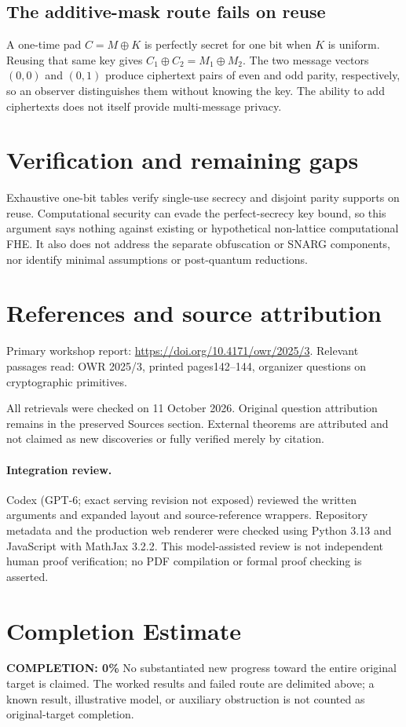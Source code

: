 \documentclass[11pt]{article}
\begin{document}
\subsection{The additive-mask route fails on reuse}
A one-time pad $C=M\oplus K$ is perfectly secret for one bit when $K$ is uniform. Reusing that same key gives $C_1\oplus C_2=M_1\oplus M_2$. The two message vectors $(0,0)$ and $(0,1)$ produce ciphertext pairs of even and odd parity, respectively, so an observer distinguishes them without knowing the key. The ability to add ciphertexts does not itself provide multi-message privacy.
\section{Verification and remaining gaps}
Exhaustive one-bit tables verify single-use secrecy and disjoint parity supports on reuse. Computational security can evade the perfect-secrecy key bound, so this argument says nothing against existing or hypothetical non-lattice computational FHE. It also does not address the separate obfuscation or SNARG components, nor identify minimal assumptions or post-quantum reductions.

\section{References and source attribution}
Primary workshop report: \url{https://doi.org/10.4171/owr/2025/3}. Relevant passages read: OWR 2025/3, printed pages142--144, organizer questions on cryptographic primitives.

All retrievals were checked on 11 October 2026. Original question attribution remains in the preserved Sources section. External theorems are attributed and not claimed as new discoveries or fully verified merely by citation.


\paragraph{Integration review.} Codex (GPT-6; exact serving revision not exposed) reviewed the written arguments and expanded layout and source-reference wrappers. Repository metadata and the production web renderer were checked using Python 3.13 and JavaScript with MathJax 3.2.2. This model-assisted review is not independent human proof verification; no PDF compilation or formal proof checking is asserted.

\section{Completion Estimate}
\noindent\textbf{COMPLETION: 0\%}
No substantiated new progress toward the entire original target is claimed. The worked results and failed route are delimited above; a known result, illustrative model, or auxiliary obstruction is not counted as original-target completion.
\end{document}
